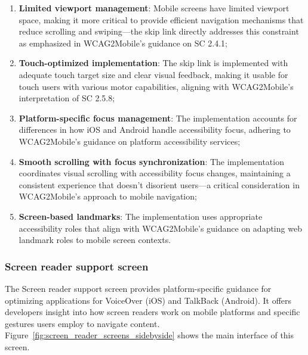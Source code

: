\begin{enumerate}
    \item \textbf{Limited viewport management}: Mobile screens have limited viewport space, making it more critical to provide efficient navigation mechanisms that reduce scrolling and swiping—the skip link directly addresses this constraint as emphasized in WCAG2Mobile's guidance on SC 2.4.1;
    
    \item \textbf{Touch-optimized implementation}: The skip link is implemented with adequate touch target size and clear visual feedback, making it usable for touch users with various motor capabilities, aligning with WCAG2Mobile's interpretation of SC 2.5.8;
    
    \item \textbf{Platform-specific focus management}: The implementation accounts for differences in how iOS and Android handle accessibility focus, adhering to WCAG2Mobile's guidance on platform accessibility services;
    
    \item \textbf{Smooth scrolling with focus synchronization}: The implementation coordinates visual scrolling with accessibility focus changes, maintaining a consistent experience that doesn't disorient users—a critical consideration in WCAG2Mobile's approach to mobile navigation;
    
    \item \textbf{Screen-based landmarks}: The implementation uses appropriate accessibility roles that align with WCAG2Mobile's guidance on adapting web landmark roles to mobile screen contexts.
\end{enumerate}

\subsubsection{Screen reader support screen}
\label{subsubsec:screen-reader-support}

The Screen reader support screen provides platform-specific guidance for optimizing applications for VoiceOver (iOS) and TalkBack (Android). It offers developers insight into how screen readers work on mobile platforms and specific gestures users employ to navigate content. Figure~\ref{fig:screen_reader_screens_sidebyside} shows the main interface of this screen.

